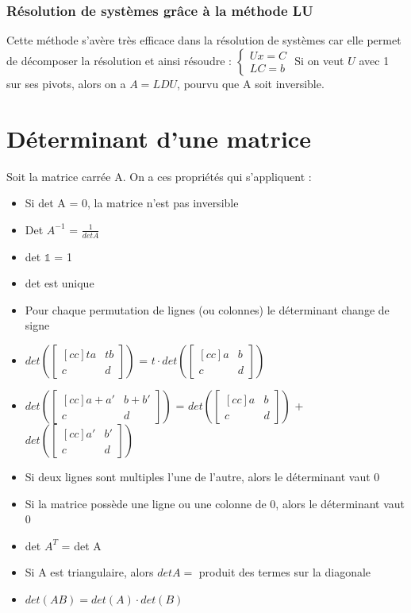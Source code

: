 \documentclass[a4paper]{book}
\begin{document}
\subsubsection{Résolution de systèmes grâce à la méthode LU}
Cette méthode s'avère très efficace dans la résolution de systèmes car elle permet de décomposer la résolution et ainsi résoudre :
$\begin{cases}
    Ux = C \\
    LC = b
\end{cases}$
Si on veut $U$ avec 1 sur ses pivots, alors on a $A = LDU$, pourvu que A soit inversible.
\section{Déterminant d'une matrice}
Soit la matrice carrée A. On a ces propriétés qui s'appliquent :
\begin{itemize}
    \item Si det A = 0, la matrice n'est pas inversible
    \item Det $A^{-1}$ = $\frac{1}{det A}$
    \item det $\mathbb{1}$ = 1
    \item det est unique
    \item Pour chaque permutation de lignes (ou colonnes) le déterminant change de signe
    \item $det\left(\begin{bmatrix}[cc]ta & tb \\c & d \end{bmatrix}\right) $ = $t\cdot det\left(\begin{bmatrix}[cc]a & b \\c & d \end{bmatrix}\right) $
    \item $det\left(\begin{bmatrix}[cc]a+a' & b+b' \\c & d \end{bmatrix}\right) $ = $det\left(\begin{bmatrix}[cc]a & b \\c & d \end{bmatrix}\right) $ + $det\left(\begin{bmatrix}[cc]a' & b' \\c & d \end{bmatrix}\right) $
    \item Si deux lignes sont multiples l'une de l'autre, alors le déterminant vaut 0
    \item Si la matrice possède une ligne ou une colonne de 0, alors le déterminant vaut 0
    \item det $A^T$ = det A
    \item Si A est triangulaire, alors $det A =$ produit des termes sur la diagonale
    \item $det(AB) = det(A) \cdot det(B)$
\end{itemize}
\end{document}
